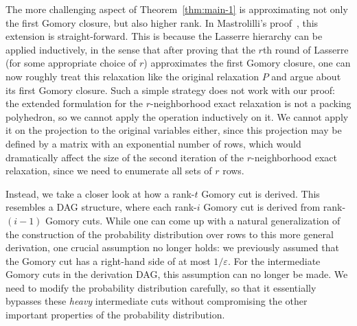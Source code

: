 \documentclass[11pt]{article}
\newcommand{\jiayetodo}[1]{\todo[backgroundcolor=greentransparent, linecolor=green!80]{#1}}
\renewcommand{\epsilon}{\varepsilon}
\theoremstyle{remark}
\begin{document}
The more challenging aspect of Theorem~\ref{thm:main-1} is approximating not only the first Gomory closure,
but also higher rank.
In Mastrolilli's proof~\cite{mas20}, this extension is straight-forward. This is because the Lasserre hierarchy can be applied inductively, in the sense that after proving that the $r$th round of Lasserre
(for some appropriate choice of $r$) approximates the first Gomory closure,
one can now roughly treat this relaxation like the original relaxation $P$ and
argue about its first Gomory closure.
Such a simple strategy does not work with our proof: the extended formulation for the $r$-neighborhood exact relaxation
is not a packing polyhedron, so we cannot apply the operation inductively on it.
We cannot apply it on the projection to the original variables either, since
this projection may be defined by a matrix with an exponential number of rows, which would dramatically affect
the size of the second iteration 
of the $r$-neighborhood exact relaxation, since we need to enumerate
all sets of $r$ rows.

Instead, we take a closer look at how a rank-$t$ Gomory cut is derived. This resembles a DAG structure,
where each rank-$i$ Gomory cut is derived from rank-$(i-1)$ Gomory cuts. While one can come up with
a natural generalization of the construction of the
probability distribution over rows to this more general derivation,
one crucial assumption no longer holds:
we previously assumed that the Gomory cut has a right-hand side of at most $1/\epsilon$. For the intermediate
Gomory cuts in the derivation DAG, this assumption can no longer be made.
We need to modify the probability distribution carefully, so that it essentially bypasses these
\emph{heavy} intermediate cuts without compromising the other important properties of the probability distribution. 

\end{document}
